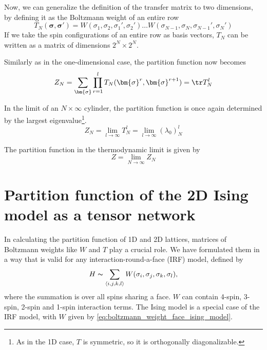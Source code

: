 Now, we can generalize the definition of the transfer matrix to two dimensions, by
defining it as the Boltzmann weight of an entire row
\begin{equation}\label{eq:row_to_row_transfer_matrix}
  T_{N}(\bm{\sigma}, \bm{\sigma'}) = W(\sigma_1, \sigma_2, \sigma_1', \sigma_2') \dots W(\sigma_{N-1}, \sigma_N, \sigma_{N-1}', \sigma_{N}')
\end{equation}
If we take the spin configurations of an entire row as basis vectors, $T_N$ can be written
as a matrix of dimensions $2^N \times 2^N$.

Similarly as in the one-dimensional case, the partition function now becomes
\begin{equation}\label{eq:z_n_times_infty}
  Z_N = \sum_{\bm{\sigma}} \prod_{r = 1}^{l} T_{N}(\bm{\sigma}^r, \bm{\sigma}^{r+1}) = \tr T_{N}^l
\end{equation}

In the limit of an $N \times \infty$ cylinder, the partition function is once again
determined by the largest eigenvalue\footnote{As in the 1D case, $T$ is symmetric, so it
is orthogonally diagonalizable.}.
\begin{equation}\label{largest_eigenvalue_transfer_matrix}
  Z_N = \lim_{l \to \infty} T_{N}^{l} = \lim_{l \to \infty} (\lambda_0)_{N}^{l}
\end{equation}

The partition function in the thermodynamic limit is given by
\begin{equation}
  Z = \lim_{N \to \infty} Z_N
\end{equation}

\section{Partition function of the 2D Ising model as a tensor network}
In calculating the partition function of 1D and 2D lattices, matrices of Boltzmann weights
like $W$ and $T$ play a crucial role. We have formulated them in a way that is valid for
any interaction-round-a-face (IRF) model, defined by
\begin{equation}
  H \thicksim \sum_{\langle i, j, k, l \rangle} W(\sigma_i, \sigma_j, \sigma_k,
  \sigma_l),
\end{equation}
where the summation is over all spins sharing a face. $W$ can contain 4-spin,
3-spin, 2-spin and 1-spin interaction terms. The Ising model is a special case of the IRF
model, with $W$ given by \autoref{eq:boltzmann_weight_face_ising_model}.

